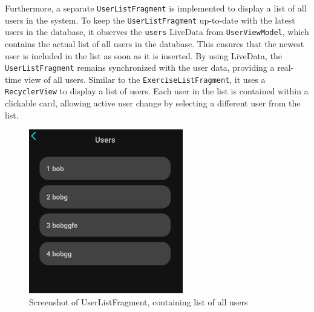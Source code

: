 Furthermore, a separate \texttt{UserListFragment} is implemented to display a list of all users in the system. 
To keep the \texttt{UserListFragment} up-to-date with the latest users in the database, it observes the \texttt{users} LiveData from \texttt{UserViewModel}, which contains the actual list of all users in the database. 
This ensures that the newest user is included in the list as soon as it is inserted. By using LiveData, the \texttt{UserListFragment} remains synchronized with the user data, providing a real-time view of all users.
Similar to the \texttt{ExerciseListFragment}, it uses a \texttt{RecyclerView} to display a list of users. 
Each user in the list is contained within a clickable card, allowing active user change by selecting a different user from the list.
\begin{figure}[H]
    \centering
    \includegraphics[width=0.6\textwidth]{images/userlistfragment-screenshot.jpeg}
    \caption{Screenshot of UserListFragment, containing list of all users}
    \label{fig:userlistfragment}
\end{figure}


